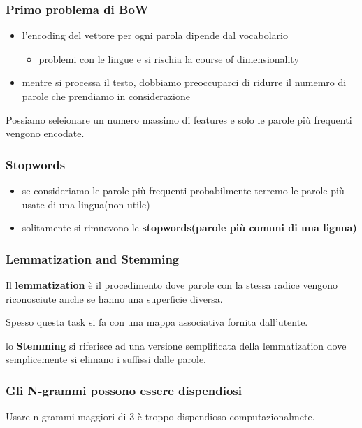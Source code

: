\subsubsection{Primo problema di BoW}
\begin{itemize}
    \item l'encoding del vettore per ogni parola dipende dal vocabolario
    \begin{itemize}
        \item problemi con le lingue e si rischia la course of dimensionality
    \end{itemize}
    \item mentre si processa il testo, dobbiamo preoccuparci di ridurre il numemro di parole
    che prendiamo in considerazione
\end{itemize}

Possiamo seleionare un numero massimo di features e solo le parole più frequenti vengono
encodate.

\subsubsection{Stopwords}
\begin{itemize}
    \item se consideriamo le parole più frequenti probabilmente terremo le parole
    più usate di una lingua(non utile)
    \item solitamente si rimuovono le \textbf{stopwords(parole più comuni di una lignua)}
\end{itemize}

\subsubsection{Lemmatization and Stemming}
Il \textbf{lemmatization} è il procedimento dove parole con la stessa radice vengono riconosciute
anche se hanno una superficie diversa.

Spesso questa task si fa con una mappa associativa fornita dall'utente.

lo \textbf{Stemming} si riferisce ad una versione semplificata della lemmatization
dove semplicemente si elimano i suffissi dalle parole.

\subsubsection{Gli N-grammi possono essere dispendiosi}
Usare n-grammi maggiori di 3 è troppo dispendioso computazionalmete.


